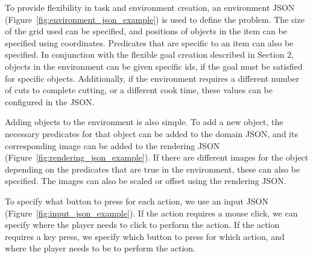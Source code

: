%

To provide flexibility in task and environment creation, an environment JSON (Figure~\ref{fig:environment_json_example}) is used to define the problem. The size of the grid used can be specified, and positions of objects in the item can be specified using coordinates. Predicates that are specific to an item can also be specified. In conjunction with the flexible goal creation described in Section 2, objects in the environment can be given specific ids, if the goal must be satisfied for specific objects. Additionally, if the environment requires a different number of cuts to complete cutting, or a different cook time, these values can be configured in the JSON. 


Adding objects to the environment is also simple. To add a new object, the necessary predicates for that object can be added to the domain JSON, and its corresponding image can be added to the rendering JSON (Figure~\ref{fig:rendering_json_example}). If there are different images for the object depending on the predicates that are true in the environment, these can also be specified. The images can also be scaled or offset using the rendering JSON. 


To specify what button to press for each action, we use an input JSON (Figure~\ref{fig:input_json_example}). If the action requires a mouse click, we can specify where the player needs to click to perform the action. If the action requires a key press, we specify which button to press for which action, and where the player needs to be to perform the action. 


